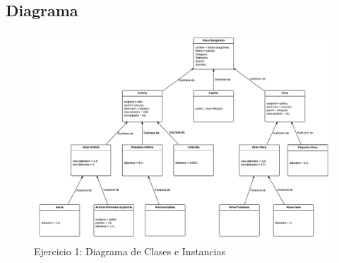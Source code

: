 \documentclass[10pt, a4paper,spanish]{article}
\begin{document}
			\begin{figure}[H]
				\centering
        
			\end{figure}

			\begin{figure}[H]
				\centering
        
			\end{figure}

			\begin{figure}[H]
				\centering
        
			\end{figure}


			\begin{figure}[H]
				\centering
        
			\end{figure}


			\begin{figure}[H]
				\centering
        
			\end{figure}

		\subsection{Diagrama}

			\begin{figure}[htpb!]
				\begin{center}
					\includegraphics[width=\textwidth]{exercise-1-diagram}
					\caption{Ejercicio 1: Diagrama de Clases e Instancias}
					\label{image:blood-vessel}
				\end{center}
			\end{figure}
\end{document}
